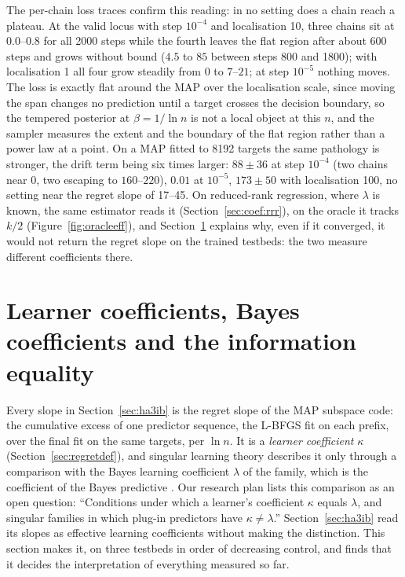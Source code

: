 \documentclass[11pt,a4paper]{article}
\begin{document}
The per-chain loss traces confirm this reading: in no setting does a chain reach a plateau. At the valid locus with step $10^{-4}$ and localisation 10, three chains sit at $0.0$--$0.8$ for all 2000 steps while the fourth leaves the flat region after about 600 steps and grows without bound ($4.5$ to $85$ between steps 800 and 1800); with localisation 1 all four grow steadily from 0 to $7$--$21$; at step $10^{-5}$ nothing moves. The loss is exactly flat around the MAP over the localisation scale, since moving the span changes no prediction until a target crosses the decision boundary, so the tempered posterior at $\beta=1/\ln n$ is not a local object at this $n$, and the sampler measures the extent and the boundary of the flat region rather than a power law at a point. On a MAP fitted to 8192 targets the same pathology is stronger, the drift term being six times larger: $88\pm36$ at step $10^{-4}$ (two chains near 0, two escaping to $160$--$220$), $0.01$ at $10^{-5}$, $173\pm50$ with localisation 100, no setting near the regret slope of 17--45. On reduced-rank regression, where $\lambda$ is known, the same estimator reads it (Section~\ref{sec:coef:rrr}), on the oracle it tracks $k/2$ (Figure~\ref{fig:oracleeff}), and Section~\ref{sec:coef} explains why, even if it converged, it would not return the regret slope on the trained testbeds: the two measure different coefficients there.

\section{Learner coefficients, Bayes coefficients and the information equality}
\label{sec:coef}

Every slope in Section~\ref{sec:ha3ib} is the regret slope of the MAP subspace code: the cumulative excess of one predictor sequence, the L-BFGS fit on each prefix, over the final fit on the same targets, per $\ln n$. It is a \emph{learner coefficient} $\kappa$ (Section~\ref{sec:regretdef}), and singular learning theory describes it only through a comparison with the Bayes learning coefficient $\lambda$ of the family, which is the coefficient of the Bayes predictive \cite{watanabe2009}. Our research plan lists this comparison as an open question: ``Conditions under which a learner's coefficient $\kappa$ equals $\lambda$, and singular families in which plug-in predictors have $\kappa\neq\lambda$.'' Section~\ref{sec:ha3ib} read its slopes as effective learning coefficients without making the distinction. This section makes it, on three testbeds in order of decreasing control, and finds that it decides the interpretation of everything measured so far.
\end{document}
